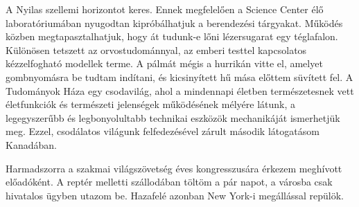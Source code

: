 A Nyilas szellemi horizontot keres. Ennek megfelelően a Science
Center élő laboratóriumában nyugodtan kipróbálhatjuk a berendezési
tárgyakat. Működés közben megtapasztalhatjuk, hogy át tudunk-e
lőni lézersugarat egy téglafalon. Különösen tetszett az orvostudománnyal,
az emberi testtel kapcsolatos kézzelfogható modellek terme.
A pálmát mégis a hurrikán vitte el, amelyet gombnyomásra be tudtam
indítani, és kicsinyített hű mása előttem süvített fel. A Tudományok
Háza egy csodavilág, ahol a mindennapi életben természetesnek vett
életfunkciók és természeti jelenségek működésének mélyére látunk,
a legegyszerűbb és legbonyolultabb technikai eszközök mechanikáját
ismerhetjük meg. Ezzel, csodálatos világunk felfedezésével zárult
második látogatásom Kanadában.

Harmadszorra a szakmai világszövetség éves kongresszusára érkezem
meghívott előadóként. A reptér melletti szállodában töltöm a pár
napot, a városba csak hivatalos ügyben utazom be. Hazafelé azonban
New York-i megállással repülök.
